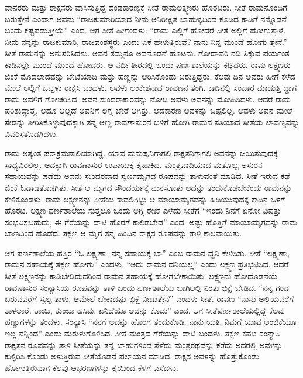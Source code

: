 ವಾನರರು ಮತ್ತು ರಾಕ್ಷಸರು ವಾಸಿಸುತ್ತಿದ್ದ ದಂಡಕಾರಣ್ಯಕ್ಕೆ ಸೀತೆ ರಾಮಲಕ್ಷ್ಮಣರು ಹೊರಟರು. ಸೀತೆ ರಾಮನೊಂದಿಗೆ ಬರುತ್ತೇನೆ ಎಂದಾಗ ಅವನು “ರಾಜಕುಮಾರಿಯಾದ ನೀನು ಅನಿರೀಕ್ಷಿತ ಬಾಹುಳ್ಯದಿಂದ ಕೂಡಿದ ಕಾಡಿಗೆ ನನ್ನೊಡನೆ ಬಂದು ಕಷ್ಟಪಡುತ್ತೀಯೆ” ಎಂದ. ಆಗ ಸೀತೆ ಹೀಗೆಂದಳು: “ರಾಮ ಎಲ್ಲಿಗೆ ಹೋದರೆ ಸೀತೆ ಅಲ್ಲಿಗೆ ಹೋಗುತ್ತಾಳೆ. ನೀನು ನನ್ನನ್ನು ರಾಜಕುಮಾರಿ, ರಾಜವಂಶಸ್ಥರು ಎಂದು ಏಕೆ ಹೇಳುತ್ತಿರುವೆ? ನಾನು ನಿನ್ನ ಮುಂದೆ ಹೋಗು ತ್ತೇನೆ.” ಸೀತೆ ರಾಮನನ್ನು ಅನುಸರಿಸಿದಳು. ಅವನ ತಮ್ಮನೂ ಅವನೊಡನೆ ಹೊಟನು. ಗೋದಾವರಿ ನದಿ ಸಿಕ್ಕುವ ಪರ್ಯಂತ ಕಾಡಿನಲ್ಲೇ ಮುಂದೆ ಮುಂದೆ ಹೋದರು. ಆ ನದೀ ತೀರದಲ್ಲಿ ಒಂದು ಪರ್ಣಶಾಲೆಯನ್ನು ಕಟ್ಟಿದರು. ರಾಮ ಲಕ್ಷ್ಮಣರು ಜಿಂಕೆ ಮೊದಲಾದವನ್ನು ಬೇಟೆಯಾಡಿ ಮತ್ತು ಹಣ್ಣನ್ನು ಆರಿಸಿಕೊಂಡು ಬರುತ್ತಿದ್ದರು. ಕೆಲವು ದಿನ ಅವರು ಹೀಗೆ ಕಳೆದ ಮೇಲೆ ಅಲ್ಲಿಗೆ ಒಬ್ಬಳು ರಾಕ್ಷಸಿ ಬಂದಳು. ಅವಳು ಲಂಕೇಶನಾದ ರಾವಣನ ತಂಗಿ. ಕಾಡಿನಲ್ಲಿ ಸಂಚಾರ ಮಾಡುತ್ತಿ ದ್ದಾಗ ರಾಮ ಅವಳಿಗೆ ಗೋಚರಿಸಿದ. ಅವನ ಸುಂದರಾಕಾರವನ್ನು ನೋಡಿ ಅವಳು ಅವನನ್ನು ಮೋಹಿಸಿದಳು. ಆದರೆ ರಾಮ ಪರಿಶುದ್ಧಾತ್ಮ. ಅದೂ ಅಲ್ಲದೆ ಅವನಿಗೆ ಲಗ್ನ ಬೇರೆ ಆಗಿತ್ತು. ಆದಕಾರಣ ಅವಳನ್ನು ಒಪ್ಪಲಿಲ್ಲ. ಅವಳು ಅವನ ಮೇಲೆ ಸೇಡನ್ನು ತೀರಿಸಿಕೊಳ್ಳುವುದಕ್ಕಾಗಿ ತನ್ನ ಅಣ್ಣ ರಾವಣಾಸುರನ ಬಳಿಗೆ ಹೋಗಿ ರಾಮನ ಸತಿಯಾದ ಸೀತೆಯ ಲಾವಣ್ಯವನ್ನು ವಿವರಿಸತೊಡಗಿದಳು.

ರಾಮ ಅತ್ಯಂತ ಪರಾಕ್ರಮಶಾಲಿಯಾಗಿದ್ದ. ಯಾವ ಮನುಷ್ಯನಿಗಾಗಲಿ ರಾಕ್ಷಸನಿಗಾಗಲಿ ಅವನನ್ನು ಜಯಿಸುವುದಕ್ಕೆ ಸಾಧ್ಯವಿರಲಿಲ್ಲ. ಅದಕ್ಕಾಗಿ ರಾವಣಾಸುರ ಉಪಾಯಕ್ಕೆ ಕೈಹಾಕಿದ. ಮಂತ್ರವಾದಿಯಾದ ಮತ್ತೊಬ್ಬ ಅಸುರನ ಸಹಾಯವನ್ನು ಪಡೆದು ಅವನು ಸುಂದರವಾದ ಸ್ವರ್ಣಮೃಗದ ರೂಪವನ್ನು ತಾಳುವಂತೆ ಮಾಡಿದ. ಸೀತೆ ಇರುವ ಕಡೆ ಜಿಂಕೆ ಓಡಾಡತೊಡಗಿತು. ಸೀತೆ ಆ ಮೃಗದ ಸೌಂದರ್ಯಕ್ಕೆ ಮನಸೋತು ಅದನ್ನು ತಂದುಕೊಡಬೇಕೆಂದು ರಾಮನನ್ನು ಕೇಳಿಕೊಂಡಳು. ರಾಮ ಲಕ್ಷ್ಮಣನನ್ನು ಸೀತೆಯ ಕಾವಲಿಗಿಟ್ಟು ಆ ಮಾಯಾಮೃಗವನ್ನು ಹಿಡಿಯುವುದಕ್ಕೆ ಕಾಡಿನ ಒಳಗೆ ಹೊರಟ. ಲಕ್ಷ್ಮಣ ಪರ್ಣಶಾಲೆಯ ಸುತ್ತಲೂ ಒಂದು ಅಗ್ನಿ ರೇಖೆ ಎಳೆದು ಸೀತೆಗೆ “ಇಂದು ನಿನಗೆ ಏನೋ ವಿಪತ್ತು ಸಂಭವಿಸಬಹುದು, ಈ ಗೆರೆಯನ್ನು ದಾಟಿ ಹೊರಗೆ ಕಾಲಿಡಬೇಡ” ಎಂದ. ಅಷ್ಟು ಹೊತ್ತಿಗೆ ಮಾಯಾಮೃಗವನ್ನು ರಾಮ ಬಾಣದಿಂದ ಹೊಡೆದ. ತಕ್ಷಣ ಆ ಮೃಗ ತನ್ನ ಹಿಂದಿನ ರಾಕ್ಷಸ ರೂಪವನ್ನು ತಾಳಿ ಕಾಲವಾಯಿತು.

ಆಗ ಪರ್ಣಶಾಲೆಯ ಹತ್ತಿರ “ಓ ಲಕ್ಷ್ಮಣಾ, ನನ್ನ ಸಹಾಯಕ್ಕೆ ಬಾ” ಎಂಬ ರಾಮನ ಧ್ವನಿ ಕೇಳಿಸಿತು. ಸೀತೆ “ಲಕ್ಷ್ಮಣಾ, ರಾಮನ ಸಹಾಯಕ್ಕೆ ತಕ್ಷಣ ಹೋಗು” ಎಂದಳು. “ಅದು ರಾಮನ ದನಿಯಲ್ಲ” ಎಂದು ಲಕ್ಷ್ಮಣ ಪ್ರತಿಭಟಿಸಿದ. ಆದರೆ ಸೀತೆ ಲಕ್ಷ್ಮಣನನ್ನು ಕಾಡಿಬೇಡಿದುದರಿಂದ ರಾಮನ ಸಹಾಯಕ್ಕೆ ಹೋಗಬೇಕಾಯಿತು. ಲಕ್ಷ್ಮಣನು ಹೋದೊಡನೆಯೆ ರಾವಣಾಸುರ ಸಂನ್ಯಾಸಿಯ ರೂಪವನ್ನು ತಾಳಿ ಬಂದು ಪರ್ಣಶಾಲೆಯ ಬಾಗಿಲಲ್ಲಿ ನಿಂತು ಭಿಕ್ಷೆ ಬೇಡಿದ. “ನನ್ನ ಗಂಡ ಬರುವವರೆಗೆ ಸ್ವಲ್ಪ ತಾಳು. ಆಮೇಲೆ ಬೇಕಾದಷ್ಟು ಭಿಕ್ಷೆ ನೀಡುತ್ತೇನೆ” ಎಂದಳು ಸೀತೆ. ರಾವಣ “ನಾನು ಅಲ್ಲಿಯವರೆಗೆ ತಾಳಲಾರೆ. ತಾಯಿ, ತುಂಬಾ ಹಸಿವು. ಏನಿದೆಯೊ ಅದನ್ನು ಕೊಡು” ಎಂದ. ಆಗ ಸೀತೆಪರ್ಣಶಾಲೆಯಲ್ಲಿದ್ದ ಕೆಲವು ಹಣ್ಣುಗಳನ್ನು ತಂದಳು. ಸಂನ್ಯಾಸಿ “ನನಗೆ ಅದನ್ನು ಹೊರಗೆ ತಂದುಕೊಡಿ. ನಾನು ಯತಿ. ನಿಮಗೆ ಯಾವ ಅಂಜಿಕೆಯೂ ಇಲ್ಲ ನನ್ನಿಂದ” ಎಂದು ಮರುಳುಗೊಳಿಸಿದ. ಸೀತೆ ಮಂತ್ರದ ಗೆರೆಯನ್ನು ದಾಟಿ ಬಂದಳು. ತಕ್ಷಣ ಕಪಟ ಸಂನ್ಯಾಸಿ ರಾಕ್ಷಸನ ರೂಪವನ್ನು ತಾಳಿ ಸೀತೆಯನ್ನು ತನ್ನ ಬಾಹುಗಳಿಂದ ಸೆಳೆದು ಮಂತ್ರರಥವನ್ನು ಕರೆದು ಅದರಲ್ಲಿ ಅವಳನ್ನು ಕುಳ್ಳಿರಿಸಿ ಕೊಂಡು ಅಳುತ್ತಿರುವ ಸೀತೆಯೊಡನೆ ಪಲಾಯನ ಮಾಡಿದ. ರಾಕ್ಷಸ ಅವಳನ್ನು ಹೊತ್ತುಕೊಂಡು ಹೋಗುತ್ತಿರುವಾಗ ಕೆಲವು ಆಭರಣಗಳನ್ನು ಕೈಯಿಂದ ಕೆಳಗೆ ಎಸೆದಳು.

